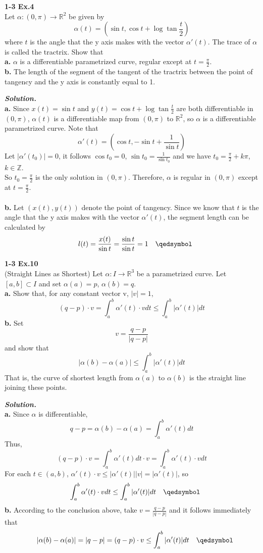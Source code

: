 \documentclass{article}
\begin{document}
\par
\textbf{1-3 Ex.4}\\
Let $\alpha: (0, \pi) \to \mathbb{R}^2$ be given by
$$
    \alpha(t) = (\sin t, \cos t + \log{\tan{\frac{t}{2}}})
$$
where $t$ is the angle that the y axis makes with the vector $\alpha'(t)$. The trace of $\alpha$ is 
called the tractrix. Show that\\
\textbf{a.} $\alpha$ is a differentiable parametrized curve, regular except at $t=\frac{\pi}{2}$.\\
\textbf{b.} The length of the segment of the tangent of the tractrix between the point of tangency and the y
axis is constantly equal to 1.

\par
\textbf{\textit{Solution.}}\\
\textbf{a. }Since $x(t) = \sin t$ and $y(t) = \cos t + \log{\tan{\frac{t}{2}}}$ are both differentiable in $(0, \pi)$,
$\alpha(t)$ is a differentiable map from $(0, \pi)$ to $\mathbb{R}^2$, so $\alpha$ is a differentiable
parametrized curve. Note that
$$
    \alpha'(t) = (\cos t, -\sin t + \frac{1}{\sin t})
$$
Let $|\alpha'(t_0)| = 0$, it follows $\cos t_0 = 0$, $\sin t_0 = \frac{1}{\sin t_0}$ and we have $t_0 = \frac{\pi}{2} + k\pi$, $k \in \mathbb{Z}$.\\
So $t_0 = \frac{\pi}{2}$ is the only solution in $(0, \pi)$. Therefore, $\alpha$ is regular in $(0, \pi)$ except at $t = \frac{\pi}{2}$. \quad \qedsymbol\\\\
\textbf{b. } Let $(x(t), y(t))$ denote the point of tangency. Since we know that $t$ is the angle that the y axis makes with the vector
$\alpha'(t)$, the segment length can be calculated by
$$
    \quad l(t) = \frac{x(t)}{\sin t} = \frac{\sin t}{\sin t} = 1 \quad \qedsymbol
$$

\par
\textbf{1-3 Ex.10}\\
(Straight Lines as Shortest) Let $\alpha: I \to \mathbb{R}^3$ be a parametrized curve. Let $[a, b] \subset I$ and set $\alpha(a) = p$, $\alpha(b) = q$.\\
\textbf{a. }Show that, for any constant vector v, $|v| = 1$,
$$
    (q - p) \cdot v = \int_a^b \alpha'(t) \cdot v dt \leq \int_a^b |\alpha'(t)|dt
$$
\textbf{b. }Set
$$
    v = \frac{q - p}{|q - p|}
$$
and show that
$$
    |\alpha(b) - \alpha(a)| \leq \int_a^b |\alpha'(t)|dt
$$
That is, the curve of shortest length from $\alpha(a)$ to $\alpha(b)$ is the straight line joining these points.

\par
\textbf{\textit{Solution.}}\\
\textbf{a. } Since $\alpha$ is differentiable,
$$
    q - p = \alpha(b) - \alpha(a) = \int_a^b \alpha'(t)dt
$$
Thus,
$$
    (q - p) \cdot v = \int_a^b \alpha'(t) dt \cdot v = \int_a^b \alpha'(t) \cdot vdt
$$
For each $t \in (a, b)$, $\alpha'(t) \cdot v \leq |\alpha'(t)||v| = |\alpha'(t)|$, so
$$
    \quad \int_a^b \alpha'(t) \cdot vdt \leq \int_a^b |\alpha'(t)|dt \quad \qedsymbol
$$
\textbf{b. } According to the conclusion above, take $v = \frac{q - p}{|q - p|}$ and
it follows immediately that
$$
    \quad |\alpha(b) - \alpha(a)| = |q - p| = (q - p) \cdot v \leq \int_a^b |\alpha'(t)|dt \quad \qedsymbol
$$
\end{document}
